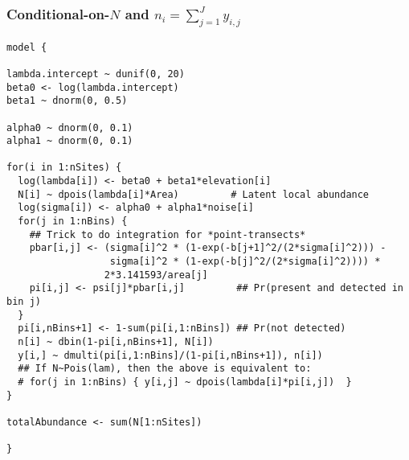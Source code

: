 \documentclass[color=usenames,dvipsnames]{beamer}\usepackage[]{graphicx}\usepackage[]{xcolor}
\makeatletter
\newenvironment{kframe}{%
 \def\at@end@of@kframe{}%
 \ifinner\ifhmode%
  \def\at@end@of@kframe{\end{minipage}}%
  \begin{minipage}{\columnwidth}%
 \fi\fi%
 \def\FrameCommand##1{\hskip\@totalleftmargin \hskip-\fboxsep
 \colorbox{shadecolor}{##1}\hskip-\fboxsep
     \hskip-\linewidth \hskip-\@totalleftmargin \hskip\columnwidth}%
 \MakeFramed {\advance\hsize-\width
   \@totalleftmargin\z@ \linewidth\hsize
   \@setminipage}}%
 {\par\unskip\endMakeFramed%
 \at@end@of@kframe}
\newenvironment{knitrout}{}{} %
\makeatother
\begin{document}
\begin{frame}[fragile]
  \frametitle{\normalsize Conditional-on-$N$ and $n_i=\sum_{j=1}^{J} y_{i,j}$}
\vspace{-3pt}
\begin{knitrout}\tiny
{}\color{fgcolor}\begin{kframe}
\begin{verbatim}
model {

lambda.intercept ~ dunif(0, 20)
beta0 <- log(lambda.intercept)
beta1 ~ dnorm(0, 0.5)

alpha0 ~ dnorm(0, 0.1)
alpha1 ~ dnorm(0, 0.1)

for(i in 1:nSites) {
  log(lambda[i]) <- beta0 + beta1*elevation[i]
  N[i] ~ dpois(lambda[i]*Area)         # Latent local abundance
  log(sigma[i]) <- alpha0 + alpha1*noise[i]
  for(j in 1:nBins) {
    ## Trick to do integration for *point-transects*
    pbar[i,j] <- (sigma[i]^2 * (1-exp(-b[j+1]^2/(2*sigma[i]^2))) -
                  sigma[i]^2 * (1-exp(-b[j]^2/(2*sigma[i]^2)))) * 
                 2*3.141593/area[j]     
    pi[i,j] <- psi[j]*pbar[i,j]         ## Pr(present and detected in bin j)
  }
  pi[i,nBins+1] <- 1-sum(pi[i,1:nBins]) ## Pr(not detected)
  n[i] ~ dbin(1-pi[i,nBins+1], N[i])
  y[i,] ~ dmulti(pi[i,1:nBins]/(1-pi[i,nBins+1]), n[i])
  ## If N~Pois(lam), then the above is equivalent to:
  # for(j in 1:nBins) { y[i,j] ~ dpois(lambda[i]*pi[i,j])  }
}

totalAbundance <- sum(N[1:nSites])

}
\end{verbatim}
\end{kframe}
\end{knitrout}
\end{frame}
\end{document}
